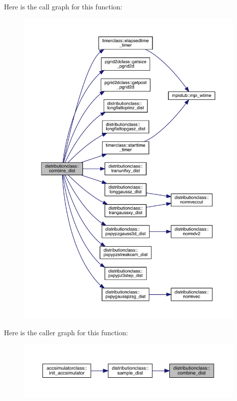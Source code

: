 Here is the call graph for this function\+:\nopagebreak
\begin{figure}[H]
\begin{center}
\leavevmode
\includegraphics[width=350pt]{namespacedistributionclass_ae01180ba4966edba5753229ef24e5b8b_cgraph}
\end{center}
\end{figure}
Here is the caller graph for this function\+:\nopagebreak
\begin{figure}[H]
\begin{center}
\leavevmode
\includegraphics[width=350pt]{namespacedistributionclass_ae01180ba4966edba5753229ef24e5b8b_icgraph}
\end{center}
\end{figure}
\mbox{\label{namespacedistributionclass_a149c64b379e691ba9bfba3dc16c44571}} 
